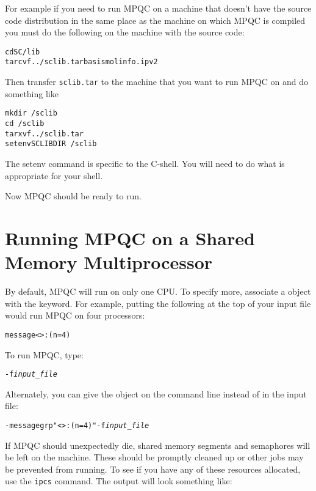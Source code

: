 For example if you need to run MPQC on a machine that doesn't
have the source code distribution in the same place as the
machine on which MPQC is compiled you must do the following
on the machine with the source code:

\begin{alltt}
cd SC/lib
tar cvf ../sclib.tar basis molinfo.ipv2
\end{alltt}

Then transfer \verb|sclib.tar| to the machine that you want to run
MPQC on and do something like

\begin{alltt}
mkdir ~/sclib
cd ~/sclib
tar xvf ../sclib.tar
setenv SCLIBDIR ~/sclib
\end{alltt}

The setenv command is specific to the C-shell.  You will need to
do what is appropriate for your shell.

Now MPQC should be ready to run.

\section{Running MPQC on a Shared Memory Multiprocessor}

By default, MPQC will run on only one CPU.  To specify more, associate a
 object with the  keyword.  For
example, putting the following at the top of your input file would run MPQC
on four processors:

\begin{alltt}
message<>:(n = 4)
\end{alltt}


To run MPQC, type:
\begin{alltt}
 {\ttfamily -f} {\itshape input_file}
\end{alltt}

  Alternately, you can give the  object on
the command line instead of in the input file:
\begin{alltt}
 {\ttfamily -messagegrp "<>:(n = 4)" -f} {\itshape input_file}
\end{alltt}

If MPQC should unexpectedly die, shared memory segments and
semaphores will be left on the machine.  These should be promptly
cleaned up or other jobs may be prevented from running.  To
see if you have any of these resources allocated, use the
\verb|ipcs| command.  The output will look something
like:

